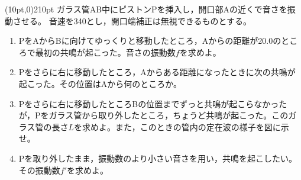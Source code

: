 \hakosyokika
\item
    \begin{mawarikomi}(10pt,0){210pt}{}
    ガラス管AB中にピストンPを挿入し，開口部Aの近くで音さを振動させる。
    音速を340とし，開口端補正は無視できるものとする。
        \begin{enumerate}
            \item PをAからBに向けてゆっくりと移動したところ，Aからの距離が20.0のところで最初の共鳴が起こった。音さの振動数$f$を求めよ。
            \item Pをさらに右に移動したところ，Aからある距離になったときに次の共鳴が起こった。その位置はAから何のところか。
            \item Pをさらに右に移動したところBの位置までずっと共鳴が起こらなかったが，Pをガラス管から取り外したところ，ちょうど共鳴が起こった。このガラス管の長さ$L$を求めよ。また，このときの管内の定在波の様子を図に示せ。
            \item Pを取り外したまま，振動数のより小さい音さを用い，共鳴を起こしたい。その振動数$f'$を求めよ。
        \end{enumerate}
    \end{mawarikomi}